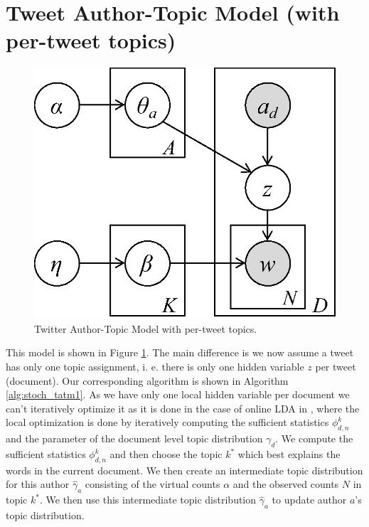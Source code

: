 \section{Tweet Author-Topic Model (with per-tweet topics)}
\begin{figure}[h]
\centering
\includegraphics[width=0.3\linewidth]{TATM1}
\caption{Twitter Author-Topic Model with per-tweet topics.}
\label{fig:TATM1}
\end{figure}
This model is shown in Figure \ref{fig:TATM1}. The main difference is we now assume a tweet has only one topic assignment, i. e. there is only one hidden variable $z$ per tweet (document). Our corresponding algorithm is shown in Algorithm \ref{alg:stoch_tatm1}. As we have only one local hidden variable per document we can't iteratively optimize it as it is done in the case of online LDA in \cite{Hoffman12}, where the local optimization is done by iteratively computing the sufficient statistics $\phi^k_{d,n}$ and the parameter of the document level topic distribution $\gamma_d$. We compute the sufficient statistics $\phi_{d,n}^k$ and then choose the topic $k^*$ which best explains the words in the current document. We then create an intermediate topic distribution for this author $\hat\gamma_a$ consisting of the virtual counts $\alpha$ and the observed counts $N$ in topic $k^*$. We then use this intermediate topic distribution $\hat\gamma_a$ to update author $a$'s topic distribution.